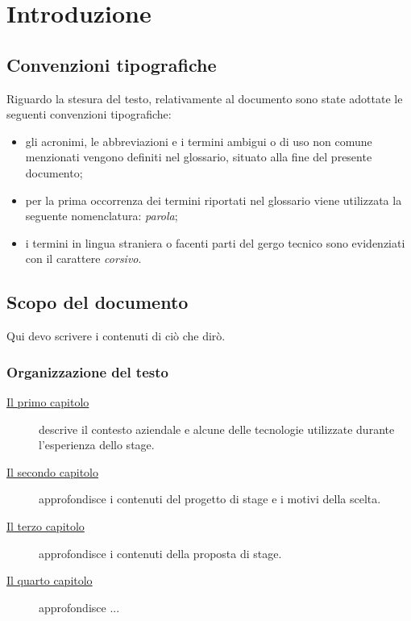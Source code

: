 
\chapter{Introduzione}
\label{cap:introduzione}
\section{Convenzioni tipografiche}

Riguardo la stesura del testo, relativamente al documento sono state adottate le seguenti convenzioni tipografiche:
\begin{itemize}
	\item gli acronimi, le abbreviazioni e i termini ambigui o di uso non comune menzionati vengono definiti nel glossario, situato alla fine del presente documento;
	\item per la prima occorrenza dei termini riportati nel glossario viene utilizzata la seguente nomenclatura: \emph{parola}\glsfirstoccur;
	\item i termini in lingua straniera o facenti parti del gergo tecnico sono evidenziati con il carattere \emph{corsivo}.
\end{itemize}

\section{Scopo del documento}
Qui devo scrivere i contenuti di ciò che dirò.


\subsection{Organizzazione del testo}

\begin{description}

    \item[{\hyperref[cap:introduzione]{Il primo capitolo}}] descrive il contesto aziendale e alcune delle tecnologie utilizzate durante l'esperienza dello stage.

    \item[{\hyperref[cap:descrizione-stage]{Il secondo capitolo}}] approfondisce i contenuti del progetto di stage e i motivi della scelta.

    \item[{\hyperref[cap:ilprogetto]{Il terzo capitolo}}] approfondisce i contenuti della proposta di stage.

    \item[{\hyperref[cap:analisi-requisiti]{Il quarto capitolo}}] approfondisce ...

\end{description}

